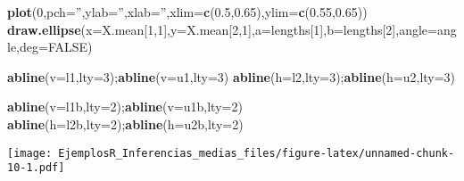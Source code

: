 \documentclass[
]{article}
\newenvironment{Shaded}{\begin{snugshade}}{\end{snugshade}}
\newcommand{\DataTypeTok}[1]{\textcolor[rgb]{0.13,0.29,0.53}{#1}}
\newcommand{\DecValTok}[1]{\textcolor[rgb]{0.00,0.00,0.81}{#1}}
\newcommand{\FloatTok}[1]{\textcolor[rgb]{0.00,0.00,0.81}{#1}}
\newcommand{\KeywordTok}[1]{\textcolor[rgb]{0.13,0.29,0.53}{\textbf{#1}}}
\newcommand{\NormalTok}[1]{#1}
\newcommand{\OtherTok}[1]{\textcolor[rgb]{0.56,0.35,0.01}{#1}}
\newcommand{\StringTok}[1]{\textcolor[rgb]{0.31,0.60,0.02}{#1}}
\begin{document}
\begin{Shaded}
\begin{Highlighting}[]
\KeywordTok{plot}\NormalTok{(}\DecValTok{0}\NormalTok{,}\DataTypeTok{pch=}\StringTok{''}\NormalTok{,}\DataTypeTok{ylab=}\StringTok{''}\NormalTok{,}\DataTypeTok{xlab=}\StringTok{''}\NormalTok{,}\DataTypeTok{xlim=}\KeywordTok{c}\NormalTok{(}\FloatTok{0.5}\NormalTok{,}\FloatTok{0.65}\NormalTok{),}\DataTypeTok{ylim=}\KeywordTok{c}\NormalTok{(}\FloatTok{0.55}\NormalTok{,}\FloatTok{0.65}\NormalTok{))}
\KeywordTok{draw.ellipse}\NormalTok{(}\DataTypeTok{x=}\NormalTok{X.mean[}\DecValTok{1}\NormalTok{,}\DecValTok{1}\NormalTok{],}\DataTypeTok{y=}\NormalTok{X.mean[}\DecValTok{2}\NormalTok{,}\DecValTok{1}\NormalTok{],}\DataTypeTok{a=}\NormalTok{lengths[}\DecValTok{1}\NormalTok{],}\DataTypeTok{b=}\NormalTok{lengths[}\DecValTok{2}\NormalTok{],}\DataTypeTok{angle=}\NormalTok{angle,}\DataTypeTok{deg=}\OtherTok{FALSE}\NormalTok{)}

\KeywordTok{abline}\NormalTok{(}\DataTypeTok{v=}\NormalTok{l1,}\DataTypeTok{lty=}\DecValTok{3}\NormalTok{);}\KeywordTok{abline}\NormalTok{(}\DataTypeTok{v=}\NormalTok{u1,}\DataTypeTok{lty=}\DecValTok{3}\NormalTok{)}
\KeywordTok{abline}\NormalTok{(}\DataTypeTok{h=}\NormalTok{l2,}\DataTypeTok{lty=}\DecValTok{3}\NormalTok{);}\KeywordTok{abline}\NormalTok{(}\DataTypeTok{h=}\NormalTok{u2,}\DataTypeTok{lty=}\DecValTok{3}\NormalTok{)}

\KeywordTok{abline}\NormalTok{(}\DataTypeTok{v=}\NormalTok{l1b,}\DataTypeTok{lty=}\DecValTok{2}\NormalTok{);}\KeywordTok{abline}\NormalTok{(}\DataTypeTok{v=}\NormalTok{u1b,}\DataTypeTok{lty=}\DecValTok{2}\NormalTok{)}
\KeywordTok{abline}\NormalTok{(}\DataTypeTok{h=}\NormalTok{l2b,}\DataTypeTok{lty=}\DecValTok{2}\NormalTok{);}\KeywordTok{abline}\NormalTok{(}\DataTypeTok{h=}\NormalTok{u2b,}\DataTypeTok{lty=}\DecValTok{2}\NormalTok{)}
\end{Highlighting}
\end{Shaded}

\texttt{[image: EjemplosR\_Inferencias\_medias\_files/figure-latex/unnamed-chunk-10-1.pdf]}
\end{document}
